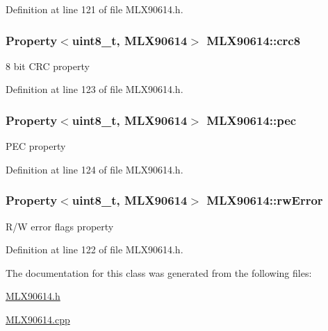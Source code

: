 Definition at line 121 of file M\-L\-X90614.\-h.

\hypertarget{class_m_l_x90614_aa13abb960da5f7d8d0eb26df8632a679}{
\subsubsection[{crc8}]{\setlength{\rightskip}{0pt plus 5cm}Property$<$uint8\-\_\-t, {\bf M\-L\-X90614}$>$ M\-L\-X90614\-::crc8}}\label{class_m_l_x90614_aa13abb960da5f7d8d0eb26df8632a679}
8 bit C\-R\-C property 

Definition at line 123 of file M\-L\-X90614.\-h.

\hypertarget{class_m_l_x90614_af050e02eecd12a127a98fb2b30e40a88}{
\subsubsection[{pec}]{\setlength{\rightskip}{0pt plus 5cm}Property$<$uint8\-\_\-t, {\bf M\-L\-X90614}$>$ M\-L\-X90614\-::pec}}\label{class_m_l_x90614_af050e02eecd12a127a98fb2b30e40a88}
P\-E\-C property 

Definition at line 124 of file M\-L\-X90614.\-h.

\hypertarget{class_m_l_x90614_a13d10b57b4369c27e740585bf3907b0e}{
\subsubsection[{rw\-Error}]{\setlength{\rightskip}{0pt plus 5cm}Property$<$uint8\-\_\-t, {\bf M\-L\-X90614}$>$ M\-L\-X90614\-::rw\-Error}}\label{class_m_l_x90614_a13d10b57b4369c27e740585bf3907b0e}
R/\-W error flags property 

Definition at line 122 of file M\-L\-X90614.\-h.



The documentation for this class was generated from the following files\-:\begin{DoxyCompactItemize}
\item 
\hyperlink{_m_l_x90614_8h}{M\-L\-X90614.\-h}\item 
\hyperlink{_m_l_x90614_8cpp}{M\-L\-X90614.\-cpp}\end{DoxyCompactItemize}
